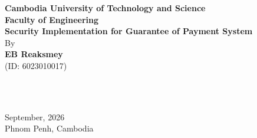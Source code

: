 \newpage
\thispagestyle{empty}

\begin{center}

 {\Large\bfseries Cambodia University of Technology and Science}\\[0.25 cm]
    {\large\bfseries Faculty of Engineering}\\[4 cm]

    {\huge\bfseries Security Implementation for Guarantee of Payment System}\\[2cm]


    {\Large By}\\[0.5cm]
    {\Large\bfseries EB Reaksmey}\\[0.5cm]
    {\Large (ID: 6023010017)}\\[3cm]
\end{center}
    \\[0.5cm]
    \\[2.5cm]
\begin{center}
    {\large September, 2026 }\\

    {\large Phnom Penh, Cambodia}

    \vspace*{\fill} %

\end{center}
